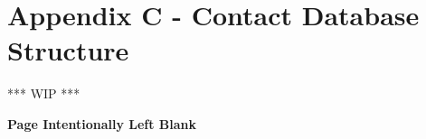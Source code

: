 \section{Appendix C - Contact Database Structure}
\label{sec:Appendix_C}
\textcolor{commentGreen}{*** WIP ***}

\textbf{Page Intentionally Left Blank}

\pagebreak